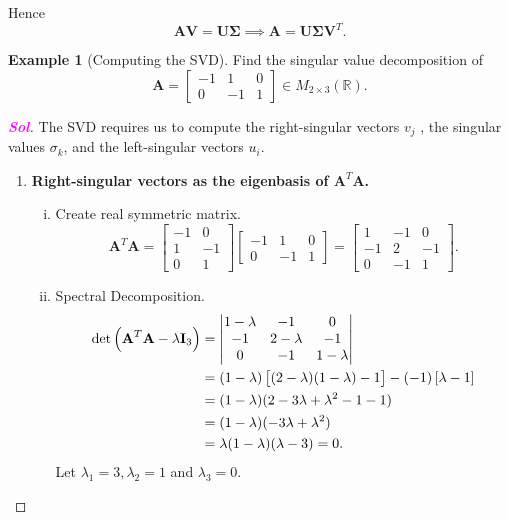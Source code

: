 \documentclass[12pt,openany]{book}
\theoremstyle{definition}
\newtheorem{example}{Example}[chapter]
\newcommand{\R}{\mathbb{R}}
\newcommand{\sol}{\textcolor{magenta}{\bf Sol}}
\newcommand{\by}{\times}
\begin{document}
	Hence \[
	\textbf{AV}=\textbf{U}\boldsymbol{\Sigma}\implies\textbf{A}=\textbf{U}\boldsymbol{\Sigma}\textbf{V}^T.
	\]
	\newpage
	\begin{example}[Computing the SVD]
		Find the singular value decomposition of \[
		\textbf{A}=\begin{bmatrix}
			-1 & 1 & 0\\
			0 & -1 & 1
		\end{bmatrix}\in M_{2\by 3}(\R).
		\]
		\begin{proof}[\sol]
			The SVD requires us to compute the right-singular vectors $v_j$ , the singular
			values $\sigma_k$, and the left-singular vectors $u_i$.
			\begin{enumerate}[(Step 1)]
				\item \textbf{Right-singular vectors as the eigenbasis of $\textbf{A}^T\textbf{A}$.} 
				\begin{enumerate}[(i)]
					\item Create real symmetric matrix. \[
					\textbf{A}^T\textbf{A}=\begin{bmatrix}
						-1 & 0\\
						1 & -1\\
						0 & 1
					\end{bmatrix}\begin{bmatrix}
						-1 & 1 & 0\\
						0 & -1 & 1
					\end{bmatrix}=\begin{bmatrix}
						1 & -1 & 0\\
						-1 & 2 & -1\\
						0 & -1 & 1
					\end{bmatrix}.
					\]
					\item Spectral Decomposition. 
					\begin{align*}
						\det\del{\textbf{A}^T\textbf{A}-\lambda\textbf{I}_3}&=\begin{vmatrix}
							1-\lambda & -1 & 0\\
							-1 & 2-\lambda & -1\\
							0 & -1 & 1-\lambda
						\end{vmatrix}\\
					&=(1-\lambda)\sbr{(2-\lambda)(1-\lambda)-1}-(-1)\sbr{\lambda-1}\\
					&=(1-\lambda)(2-3\lambda+\lambda^2-1-1)\\
					&=(1-\lambda)(-3\lambda+\lambda^2)\\
					&=\lambda(1-\lambda)(\lambda-3)=0.
					\end{align*} Let \(\lambda_1=3,\lambda_2=1\) and \(\lambda_3=0\).

\end{enumerate}
\end{enumerate}
\end{proof}
\end{example}
\end{document}
